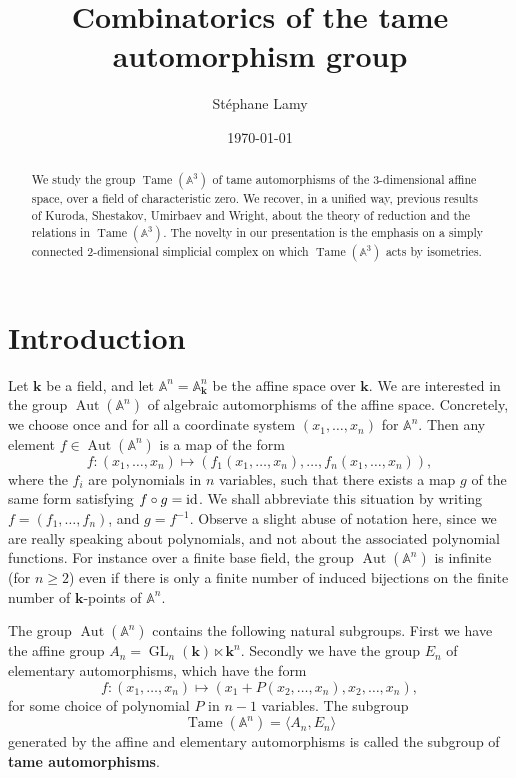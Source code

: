 \documentclass[reqno,oneside,11pt]{amsart}
\title[Combinatorics of the tame automorphism group]{Combinatorics of the tame automorphism group}
\author{Stéphane Lamy}
\date{\today}
\theoremstyle{plain}
\theoremstyle{definition}
\newcommand{\A}{{\mathbb{A}}}
\newcommand{\K}{\mathbf{k}}
\DeclareMathOperator{\GL}{GL}
\DeclareMathOperator{\Aut}{Aut}
\DeclareMathOperator{\Tame}{Tame}
\newcommand{\id}{\text{\rm id}}
\newcommand{\TA}{\Tame(\A^3)}
\renewcommand{\ge}{\geqslant}
\begin{document}
\begin{abstract}
We study the group $\TA$ of tame automorphisms of the 3-dimensional affine space, over a field of characteristic zero.
We recover, in a unified way, previous results of Kuroda, Shestakov, Umirbaev
and Wright, about the theory of reduction and the relations in $\TA$.
The novelty in our presentation is the emphasis on a simply connected  2-dimensional simplicial complex on which $\TA$ acts by isometries.
\end{abstract}

\maketitle

\setcounter{tocdepth}{2}
\tableofcontents


\section*{Introduction}

Let $\K$ be a field, and let $\A^n = \A_\K^n$ be the affine space over $\K$.
We are interested in the group $\Aut(\A^n)$ of algebraic automorphisms of the affine space.
Concretely, we choose once and for all a coordinate system $(x_1, \dots, x_n)$ for $\A^n$.
Then any element $f \in\Aut(\A^n)$ is a map of the form
$$ f\colon(x_1, \dots, x_n) \mapsto (f_1(x_1, \dots, x_n), \dots, f_n(x_1, \dots, x_n)),$$
where the $f_i$ are polynomials in $n$ variables, such that there exists a map $g$ of the same form satisfying $f \circ g = \id$.
We shall abbreviate this situation by writing $f = (f_1, \dots, f_n)$, and $g = f^{-1}$.
Observe a slight abuse of notation here, since we are really
speaking about polynomials, and not about the associated polynomial
functions.
For instance over a finite base field, the group $\Aut(\A^n)$ is
infinite (for $n \ge 2$) even if there is only a finite number of induced bijections on the
finite number of $\K$-points of $\A^n$.

The group $\Aut(\A^n)$ contains the following natural subgroups.
First we have the affine group $A_n = \GL_n(\K) \ltimes \K^n$.
Secondly we have the group $E_n$ of elementary automorphisms, which have the form
$$ f\colon(x_1, \dots, x_n) \mapsto (x_1 + P(x_2, \dots, x_n), x_2, \dots, x_n),$$
for some choice of polynomial $P$ in $n-1$ variables.
The subgroup
$$\Tame(\A^n) = \langle A_n, E_n \rangle$$
generated by the affine and elementary automorphisms is called the subgroup of \textbf{tame automorphisms}.
\end{document}
